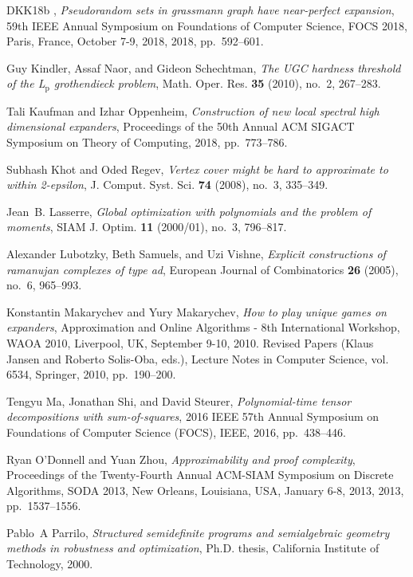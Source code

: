 \documentclass[11pt]{article}
\theoremstyle{definition}
\begin{document}
\begin{thebibliography}{DKK{\etalchar{+}}18b}
\bysame, \emph{Pseudorandom sets in grassmann graph have near-perfect
  expansion}, 59th {IEEE} Annual Symposium on Foundations of Computer Science,
  {FOCS} 2018, Paris, France, October 7-9, 2018, 2018, pp.~592--601.

Guy Kindler, Assaf Naor, and Gideon Schechtman, \emph{The {UGC} hardness
  threshold of the \emph{L\({}_{\mbox{p}}\)} grothendieck problem}, Math. Oper.
  Res. \textbf{35} (2010), no.~2, 267--283.

Tali Kaufman and Izhar Oppenheim, \emph{Construction of new local spectral high
  dimensional expanders}, Proceedings of the 50th Annual ACM SIGACT Symposium
  on Theory of Computing, 2018, pp.~773--786.

Subhash Khot and Oded Regev, \emph{Vertex cover might be hard to approximate to
  within 2-epsilon}, J. Comput. Syst. Sci. \textbf{74} (2008), no.~3, 335--349.

Jean~B. Lasserre, \emph{Global optimization with polynomials and the problem of
  moments}, SIAM J. Optim. \textbf{11} (2000/01), no.~3, 796--817. 

Alexander Lubotzky, Beth Samuels, and Uzi Vishne, \emph{Explicit constructions
  of ramanujan complexes of type ad}, European Journal of Combinatorics
  \textbf{26} (2005), no.~6, 965--993.

Konstantin Makarychev and Yury Makarychev, \emph{How to play unique games on
  expanders}, Approximation and Online Algorithms - 8th International Workshop,
  {WAOA} 2010, Liverpool, UK, September 9-10, 2010. Revised Papers (Klaus
  Jansen and Roberto Solis{-}Oba, eds.), Lecture Notes in Computer Science,
  vol. 6534, Springer, 2010, pp.~190--200.

Tengyu Ma, Jonathan Shi, and David Steurer, \emph{Polynomial-time tensor
  decompositions with sum-of-squares}, 2016 IEEE 57th Annual Symposium on
  Foundations of Computer Science (FOCS), IEEE, 2016, pp.~438--446.

Ryan O'Donnell and Yuan Zhou, \emph{Approximability and proof complexity},
  Proceedings of the Twenty-Fourth Annual {ACM-SIAM} Symposium on Discrete
  Algorithms, {SODA} 2013, New Orleans, Louisiana, USA, January 6-8, 2013,
  2013, pp.~1537--1556.

Pablo~A Parrilo, \emph{Structured semidefinite programs and semialgebraic
  geometry methods in robustness and optimization}, Ph.D. thesis, California
  Institute of Technology, 2000.


\end{thebibliography}
\end{document}
